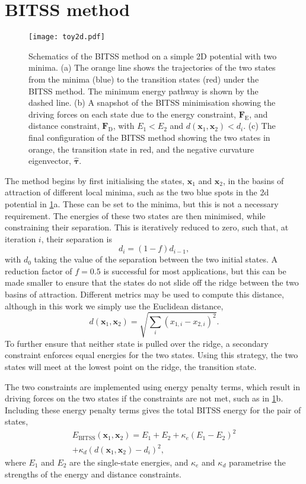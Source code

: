\documentclass[aip,jcp,reprint,twocolumn]{revtex4-1}
\begin{document}
\section{BITSS method}
\begin{figure}[tb]
  \texttt{[image: toy2d.pdf]}
  \caption{\label{fig:toy2d}
    Schematics of the BITSS method on a simple 2D potential with two minima.
    (a) The orange line shows the trajectories of the two states from the minima (blue) to the transition states (red) under the BITSS method.
        The minimum energy pathway is shown by the dashed line.
    (b) A snapshot of the BITSS minimisation showing the driving forces on each state due to the energy constraint, $\bm{F}_\mathrm{E}$, and distance constraint, $\bm{F}_\mathrm{D}$, with $E_1 < E_2$ and $d(\bm{x}_1,\bm{x}_2) < d_i$.
    (c) The final configuration of the BITSS method showing the two states in orange, the transition state in red, and the negative curvature eigenvector, $\bm{\hat{\tau}}$.
  }
\end{figure}

The method begins by first initialising the states, $\bm{x}_1$ and $\bm{x}_2$, in the basins of attraction of different local minima, such as the two blue spots in the 2d potential in \cref{fig:toy2d}a.
These can be set to the minima, but this is not a necessary requirement.
The energies of these two states are then minimised, while constraining their separation.
This is iteratively reduced to zero, such that, at iteration $i$, their separation is
\begin{equation}\label{eq:diteration}
  d_i = (1 - f) d_{i-1},
\end{equation}
with $d_0$ taking the value of the separation between the two initial states.
A reduction factor of $f = 0.5$ is successful for most applications, but this can be made smaller to ensure that the states do not slide off the ridge between the two basins of attraction.
Different metrics may be used to compute this distance, although in this work we simply use the Euclidean distance,
\begin{equation}
  d(\bm{x}_1, \bm{x}_2) = \sqrt{\sum_i (x_{1,i} - x_{2,i})^2}.
\end{equation}
To further ensure that neither state is pulled over the ridge, a secondary constraint enforces equal energies for the two states.
Using this strategy, the two states will meet at the lowest point on the ridge, the transition state.

The two constraints are implemented using energy penalty terms, which result in driving forces on the two states if the constraints are not met, such as in \cref{fig:toy2d}b.
Including these energy penalty terms gives the total BITSS energy for the pair of states,
\begin{multline}\label{eq:bitss}
  E_\mathrm{BITSS}(\bm{x}_1, \bm{x}_2) = E_1 + E_2
    + \kappa_e \left( E_1 - E_2 \right) ^2 \\
    + \kappa_d \left( d(\bm{x}_1, \bm{x}_2) - d_i \right) ^2,
\end{multline}
where $E_1$ and $E_2$ are the single-state energies, and $\kappa_e$ and $\kappa_d$ parametrise the strengths of the energy and distance constraints.
\end{document}
